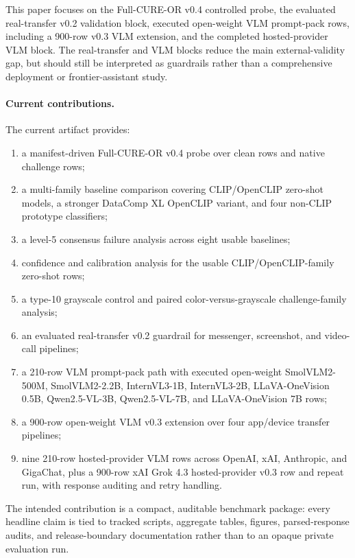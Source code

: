 \documentclass[10pt]{article}
\begin{document}
This paper focuses on the Full-CURE-OR v0.4 controlled probe, the evaluated real-transfer v0.2 validation block, executed open-weight VLM prompt-pack rows, including a 900-row v0.3 VLM extension, and the completed hosted-provider VLM block. The real-transfer and VLM blocks reduce the main external-validity gap, but should still be interpreted as guardrails rather than a comprehensive deployment or frontier-assistant study.

\paragraph{Current contributions.}
The current artifact provides:
\begin{enumerate}
  \item a manifest-driven Full-CURE-OR v0.4 probe over clean rows and native challenge rows;
  \item a multi-family baseline comparison covering CLIP/OpenCLIP zero-shot models, a stronger DataComp XL OpenCLIP variant, and four non-CLIP prototype classifiers;
  \item a level-5 consensus failure analysis across eight usable baselines;
  \item confidence and calibration analysis for the usable CLIP/OpenCLIP-family zero-shot rows;
  \item a type-10 grayscale control and paired color-versus-grayscale challenge-family analysis;
  \item an evaluated real-transfer v0.2 guardrail for messenger, screenshot, and video-call pipelines;
  \item a 210-row VLM prompt-pack path with executed open-weight SmolVLM2-500M, SmolVLM2-2.2B, InternVL3-1B, InternVL3-2B, LLaVA-OneVision 0.5B, Qwen2.5-VL-3B, Qwen2.5-VL-7B, and LLaVA-OneVision 7B rows;
  \item a 900-row open-weight VLM v0.3 extension over four app/device transfer pipelines;
  \item nine 210-row hosted-provider VLM rows across OpenAI, xAI, Anthropic, and GigaChat, plus a 900-row xAI Grok 4.3 hosted-provider v0.3 row and repeat run, with response auditing and retry handling.
\end{enumerate}

The intended contribution is a compact, auditable benchmark package: every headline claim is tied to tracked scripts, aggregate tables, figures, parsed-response audits, and release-boundary documentation rather than to an opaque private evaluation run.
\end{document}
